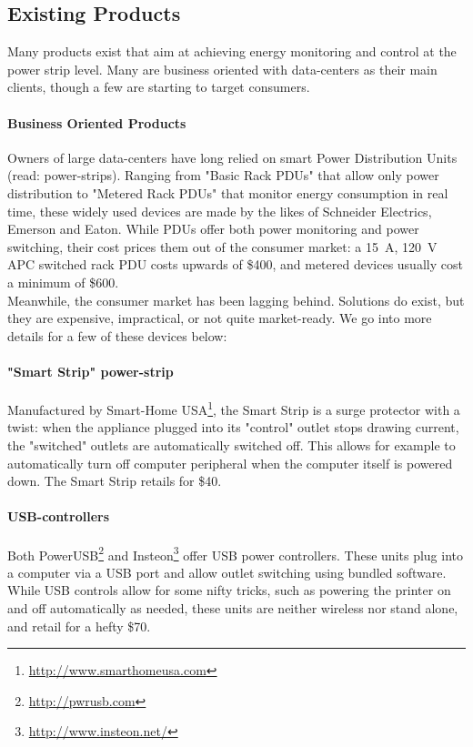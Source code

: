 \subsection{Existing Products}

Many products exist that aim at achieving energy monitoring and control at the power strip level. Many are business oriented with data-centers as their main clients, though a few are starting to target consumers.\\

\paragraph{Business Oriented Products} Owners of large data-centers have long relied on smart Power Distribution Units (read: power-strips). Ranging from "Basic Rack PDUs" that allow only power distribution to "Metered Rack PDUs" that monitor energy consumption in real time, these widely used devices are made by the likes of Schneider Electrics, Emerson and Eaton. While PDUs offer both power monitoring and power switching, their cost prices them out of the consumer market: a \SI{15}{\ampere}, \SI{120}{\volt} APC switched rack PDU costs upwards of \$400, and metered devices usually cost a minimum of \$600.\\

Meanwhile, the consumer market has been lagging behind. Solutions do exist, but they are expensive, impractical, or not quite market-ready. We go into more details for a few of these devices below:

\paragraph{"Smart Strip" power-strip} Manufactured by Smart-Home USA\footnote{\url{http://www.smarthomeusa.com}}, the Smart Strip is a surge protector with a twist: when the appliance plugged into its "control" outlet stops drawing current, the "switched" outlets are automatically switched off. This allows for example to automatically turn off computer peripheral when the computer itself is powered down. The Smart Strip retails for \$40.

\paragraph{USB-controllers} Both PowerUSB\footnote{\url{http://pwrusb.com}} and Insteon\footnote{\url{http://www.insteon.net/}} offer USB power controllers. These units plug into a computer via a USB port and allow outlet switching using bundled software.  While USB controls allow for some nifty tricks, such as powering the printer on and off automatically as needed, these units are neither wireless nor stand alone, and retail for a hefty \$70.


